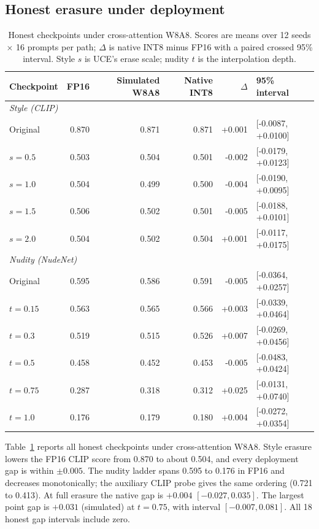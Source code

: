 \documentclass[conference]{IEEEtran}
\begin{document}
\subsection{Honest erasure under deployment}
\begin{table}[t]
\centering
\caption{Honest checkpoints under cross-attention W8A8. Scores are means over 12 seeds
$\times$ 16 prompts per path; $\Delta$ is native INT8 minus FP16 with a paired crossed
95\% interval. Style $s$ is UCE's erase scale; nudity $t$ is the interpolation depth.}
\label{tab:passive}
\begin{tabular}{lrrrrl}
\toprule
Checkpoint & FP16 & Simulated W8A8 & Native INT8 & $\Delta$ & 95\% interval\\
\midrule
\multicolumn{6}{l}{\textit{Style (CLIP)}} \\
Original & 0.870 & 0.871 & 0.871 & +0.001 & [-0.0087, +0.0100] \\
$s=0.5$ & 0.503 & 0.504 & 0.501 & -0.002 & [-0.0179, +0.0123] \\
$s=1.0$ & 0.504 & 0.499 & 0.500 & -0.004 & [-0.0190, +0.0095] \\
$s=1.5$ & 0.506 & 0.502 & 0.501 & -0.005 & [-0.0188, +0.0101] \\
$s=2.0$ & 0.504 & 0.502 & 0.504 & +0.001 & [-0.0117, +0.0175] \\
\multicolumn{6}{l}{\textit{Nudity (NudeNet)}} \\
Original & 0.595 & 0.586 & 0.591 & -0.005 & [-0.0364, +0.0257] \\
$t=0.15$ & 0.563 & 0.565 & 0.566 & +0.003 & [-0.0339, +0.0464] \\
$t=0.3$ & 0.519 & 0.515 & 0.526 & +0.007 & [-0.0269, +0.0456] \\
$t=0.5$ & 0.458 & 0.452 & 0.453 & -0.005 & [-0.0483, +0.0424] \\
$t=0.75$ & 0.287 & 0.318 & 0.312 & +0.025 & [-0.0131, +0.0740] \\
$t=1.0$ & 0.176 & 0.179 & 0.180 & +0.004 & [-0.0272, +0.0354] \\
\bottomrule
\end{tabular}
\end{table}

Table~\ref{tab:passive} reports all honest checkpoints under cross-attention W8A8.
Style erasure lowers the FP16 CLIP score from 0.870 to about 0.504, and every
deployment gap is within $\pm0.005$. The nudity ladder spans 0.595 to 0.176 in
FP16 and decreases monotonically; the auxiliary CLIP probe gives the same ordering
(0.721 to 0.413). At full erasure the native gap is $+0.004$ $[-0.027,0.035]$. The
largest point gap is $+0.031$ (simulated) at $t=0.75$, with interval
$[-0.007,0.081]$. All 18 honest gap intervals include zero.
\end{document}
